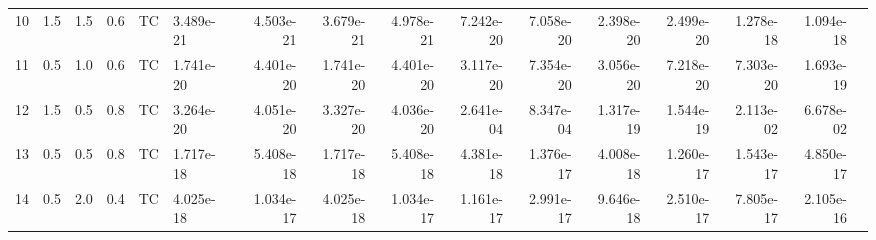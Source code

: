\begin{tabular}{lrrrllrrrrrrrrrr}
10 &  1.5 &  1.5 &  0.6 &  TC  &        3.489e-21 &  4.503e-21 &  3.679e-21 &  4.978e-21 &  7.242e-20 &  7.058e-20 &   2.398e-20 &  2.499e-20 &  1.278e-18 &  1.094e-18 \\
11 &  0.5 &  1.0 &  0.6 &  TC  &        1.741e-20 &  4.401e-20 &  1.741e-20 &  4.401e-20 &  3.117e-20 &  7.354e-20 &   3.056e-20 &  7.218e-20 &  7.303e-20 &  1.693e-19 \\
12 &  1.5 &  0.5 &  0.8 &  TC  &        3.264e-20 &  4.051e-20 &  3.327e-20 &  4.036e-20 &  2.641e-04 &  8.347e-04 &   1.317e-19 &  1.544e-19 &  2.113e-02 &  6.678e-02 \\
13 &  0.5 &  0.5 &  0.8 &  TC  &        1.717e-18 &  5.408e-18 &  1.717e-18 &  5.408e-18 &  4.381e-18 &  1.376e-17 &   4.008e-18 &  1.260e-17 &  1.543e-17 &  4.850e-17 \\
14 &  0.5 &  2.0 &  0.4 &  TC  &        4.025e-18 &  1.034e-17 &  4.025e-18 &  1.034e-17 &  1.161e-17 &  2.991e-17 &   9.646e-18 &  2.510e-17 &  7.805e-17 &  2.105e-16 \\
\bottomrule
\end{tabular}
